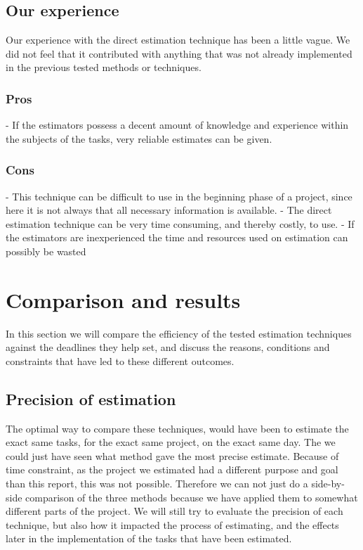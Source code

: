 \subsection{Our experience}
Our experience with the direct estimation technique has been a little vague. We did not feel that it contributed with anything that was not already implemented in the previous tested methods or techniques. 

\subsubsection{Pros}
- If the estimators possess a decent amount of knowledge and experience within the subjects of the tasks, very reliable estimates can be given. 

\subsubsection{Cons}
- This technique can be difficult to use in the beginning phase of a project, since here it is not always that all necessary information is available.
- The direct estimation technique can be very time consuming, and thereby costly, to use.
- If the estimators are inexperienced the time and resources used on estimation can possibly be wasted


\section{Comparison and results}

In this section we will compare the efficiency of the tested estimation techniques against the deadlines they help set, and discuss the reasons, conditions and constraints that have led to these different outcomes.

\subsection{Precision of estimation}
The optimal way to compare these techniques, would have been to estimate the exact same tasks, for the exact same project, on the exact same day. The we could just have seen what method gave the most precise estimate. Because of time constraint, as the project we estimated had a different purpose and goal than this report, this was not possible. Therefore we can not just do a side-by-side comparison of the three methods because we have applied them to somewhat different parts of the project. We will still try to evaluate the precision of each technique, but also how it impacted the process of estimating, and the effects later in the implementation of the tasks that have been estimated. \\


